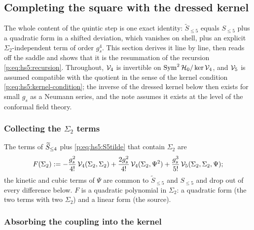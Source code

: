 \subsection{Completing the square with the dressed kernel}
\label{q:sec:square}

The whole content of the quintic step is one exact identity: $\widetilde S_{\le5}$ equals $S_{\le5}$ plus a quadratic form in a shifted deviation, which vanishes on shell, plus an explicit $\Sigma_2$-independent term of order $g_s^4$.
This section derives it line by line, then reads off the saddle and shows that it is the resummation of the recursion \eqref{p:eq:hs5:recursion}.
Throughout, $\mc V_4$ is invertible on $\Sym^2\mc H_0/\ker\mc V_4$, and $\mc V_5$ is assumed compatible with the quotient in the sense of the kernel condition \eqref{p:eq:hs5:kernel-condition}; the inverse of the dressed kernel below then exists for small $g_s$ as a Neumann series, and the note assumes it exists at the level of the conformal field theory.

\subsubsection{Collecting the \texorpdfstring{$\Sigma_2$}{Sigma2} terms}
\label{q:sec:square:collect}

The terms of $\caction[\le 4]$ plus \eqref{p:eq:hs5:S5tilde} that contain $\Sigma_2$ are
\begin{equation}
  \label{q:eq:square:F}
  F(\Sigma_2)
    := - \frac{g_s^2}{4!} \, \mc V_4(\Sigma_2, \Sigma_2)
      + \frac{2 g_s^2}{4!} \, \mc V_4(\Sigma_2, \Psi^2)
      + \frac{g_s^3}{5!} \, \mc V_5(\Sigma_2, \Sigma_2, \Psi);
\end{equation}
the kinetic and cubic terms of $\Psi$ are common to $\widetilde S_{\le5}$ and $S_{\le5}$ and drop out of every difference below.
$F$ is a quadratic polynomial in $\Sigma_2$: a quadratic form (the two terms with two $\Sigma_2$) and a linear form (the source).

\subsubsection{Absorbing the coupling into the kernel}
\label{q:sec:square:kernel}

